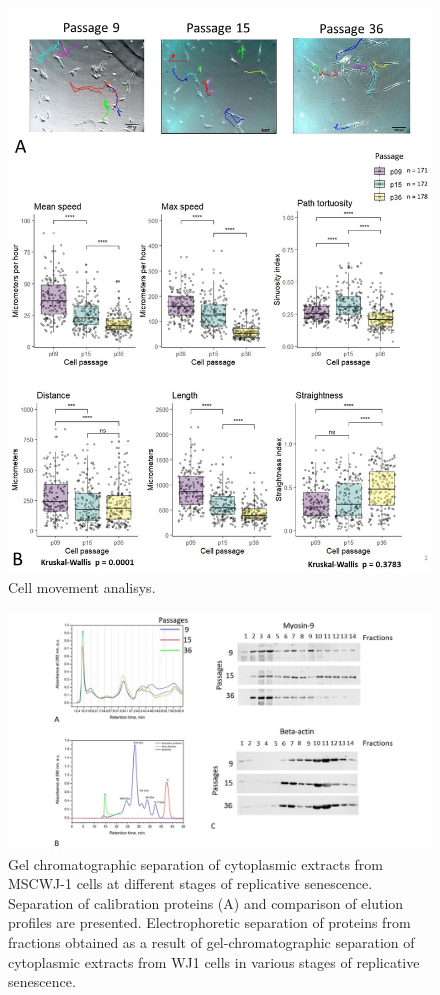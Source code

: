 \documentclass[alpha-refs]{wiley-article}
\begin{document}
\begin{figure}[hbt!]
  \includegraphics[width=1\linewidth]{traj.jpg}
  \caption{Cell movement analisys.}
  \centering
\end{figure}

\begin{figure}[hbt!]
\centering
\includegraphics[width=1\linewidth]{fplc.jpg}
\caption{Gel chromatographic separation of cytoplasmic extracts from MSCWJ-1 cells at different stages of replicative senescence. Separation of calibration proteins (A) and comparison of elution profiles are presented. Electrophoretic separation of proteins from fractions obtained as a result of gel-chromatographic separation of cytoplasmic extracts from WJ1 cells in various stages of replicative senescence.}
\end{figure}
\end{document}
